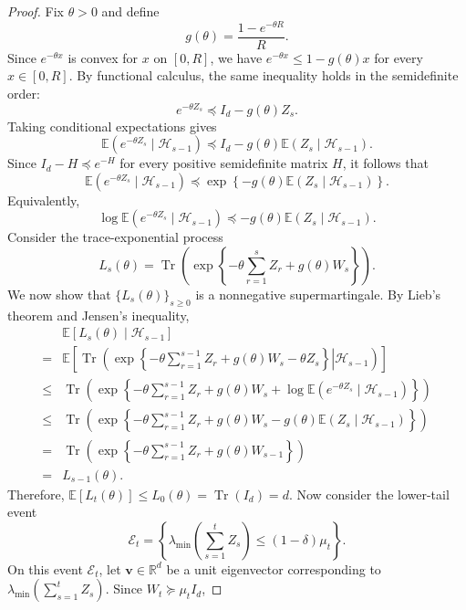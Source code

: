 \documentclass[12pt]{article}
\begin{document}
\begin{proof}
Fix $\theta>0$ and define
\[
g(\theta) = \frac{1-e^{-\theta R}}{R}.
\]
Since $e^{-\theta x}$ is convex for $x$ on $[0,R]$, we have $e^{-\theta x} \le 1-g(\theta)x$ for every $x\in[0,R]$. By functional calculus, the same inequality holds in
the semidefinite order:
\[
e^{-\theta Z_s}
\preceq
I_d-g(\theta)Z_s.
\]
Taking conditional expectations gives
\[
\mathbb E\left(
e^{-\theta Z_s}
\mid
\mathcal H_{s-1}
\right)
\preceq
I_d-g(\theta)\mathbb E\left( Z_s \mid \mathcal H_{s-1} \right).
\]
Since $I_d-H \preceq e^{-H}$ for every positive semidefinite matrix $H$, it follows that
\[
\mathbb E\left(
e^{-\theta Z_s}
\mid
\mathcal H_{s-1}
\right)
\preceq
\exp\left\{
-g(\theta)\mathbb E\left( Z_s \mid \mathcal H_{s-1} \right)
\right\}.
\]
Equivalently,
\[
\log
\mathbb E\left(
e^{-\theta Z_s}
\mid
\mathcal H_{s-1}
\right)
\preceq
-g(\theta)\mathbb E\left( Z_s \mid \mathcal H_{s-1} \right).
\]
Consider the trace-exponential process
\[
L_s(\theta) =
\operatorname{Tr} \left(
\exp\left\{
-\theta \sum_{r=1}^s Z_r
+ g(\theta)W_s
\right\} \right).
\]
We now show that $\{L_s(\theta)\}_{s\ge0}$ is a nonnegative supermartingale. By Lieb's theorem and Jensen's inequality,
\begin{align*}
& \mathbb E\left[ L_s(\theta) \mid \mathcal H_{s-1} \right] \\
=&
\mathbb E\left[
\left.
\operatorname{Tr}
\left( \exp\left\{
-\theta \sum_{r=1}^{s-1} Z_r
+ g(\theta)W_s
- \theta Z_s
\right\}
\right|
\mathcal H_{s-1}
\right) \right] \\
\le &
\operatorname{Tr} \left(
\exp\left\{
-\theta \sum_{r=1}^{s-1} Z_r
+ g(\theta)W_s
+ \log \mathbb E\left( e^{-\theta Z_s} \mid \mathcal H_{s-1} \right)
\right\} \right) \\
\le &
\operatorname{Tr} \left(
\exp\left\{
-\theta \sum_{r=1}^{s-1} Z_r
+
g(\theta)W_s
- g(\theta)\mathbb E\left( Z_s \mid \mathcal H_{s-1} \right)
\right\} \right) \\
= &
\operatorname{Tr} \left(
\exp\left\{
-\theta \sum_{r=1}^{s-1} Z_r
+ g(\theta)W_{s-1}
\right\} \right) \\
= & L_{s-1}(\theta).
\end{align*}
Therefore, $\mathbb E\left[ L_t(\theta) \right] \le L_0(\theta) = \operatorname{Tr}(I_d) = d$.
Now consider the lower-tail event 
$$\mathcal E_t=\left\{ \lambda_{\min}\left(\sum_{s=1}^t Z_s\right) \le (1-\delta)\mu_t \right\}.$$
On this event $\mathcal E_t$, let $\bm v \in \mathbb R^d$ be a unit eigenvector corresponding to $\lambda_{\min}(\sum_{s=1}^t Z_s)$. Since $W_t \succeq \mu_t I_d$,

\end{proof}
\end{document}
